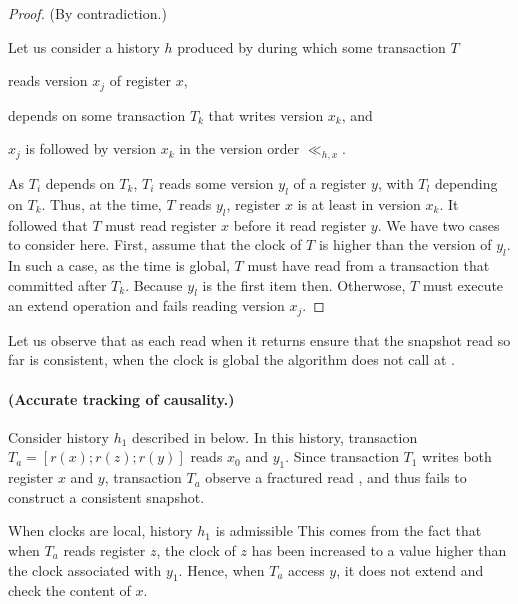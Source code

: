 \begin{proof}
  (By contradiction.)
  
  Let us consider a history $h$ produced by  during which some transaction $T$
  \begin{inparaenum}[\em(i)]
  \item reads version $x_j$ of register $x$,
  \item depends on some transaction $T_k$ that writes version $x_k$, and
  \item $x_j$ is followed by version $x_k$ in the version order $\ll_{h,x}$.
  \end{inparaenum}

  As $T_i$ depends on $T_k$, $T_i$ reads some version $y_l$ of a register $y$, with $T_l$ depending on $T_k$.
  Thus, at the time, $T$ reads $y_l$, register $x$ is at least in version $x_k$.
  It followed that $T$ must read register $x$ before it read register $y$.
  We have two cases to consider here.
  First, assume that the clock of $T$ is higher than the version of $y_l$.
  In such a case, as the time is global, $T$ must have read from a transaction that committed after $T_k$.
  Because $y_l$ is the first item then.
  Otherwose, $T$ must execute an extend operation and fails reading version $x_j$.  
\end{proof}

Let us observe that as each read when it returns ensure that the snapshot read so far is consistent, when the clock is global the algorithm does not call \stmExtend{} at .

\paragraph{(Accurate tracking of causality.)}
Consider history $h_1$ described in  below.
In this history, transaction $T_a=[r(x);r(z);r(y)]$ reads $x_0$ and $y_1$.
Since transaction $T_1$ writes both register $x$ and $y$, transaction $T_a$ observe a fractured read \cite{}, and thus fails to construct a consistent snapshot.

 
When clocks are local, history $h_1$ is admissible 
This comes from the fact that when $T_a$ reads register $z$, the clock of $z$ has been increased to a value higher than the clock associated with $y_1$.
Hence, when $T_a$ access $y$, it does not extend and check the content of $x$.

